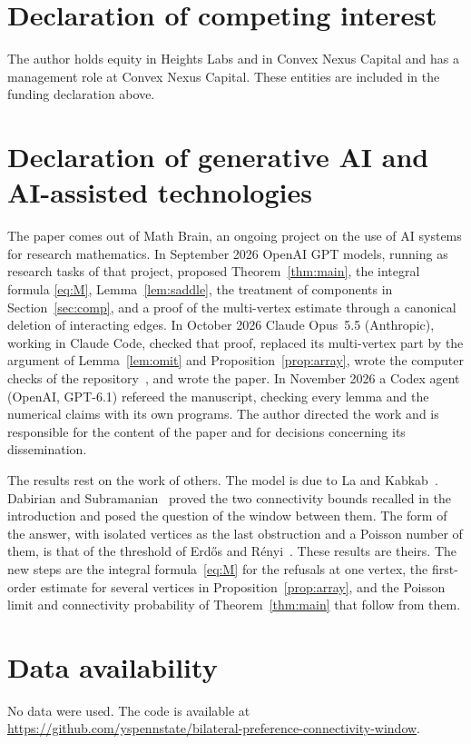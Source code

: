 \documentclass[11pt]{amsart}
\theoremstyle{remark}
\numberwithin{equation}{section}
\newcommand{\1}{\mathbf 1}
\begin{document}
\section*{Declaration of competing interest}
The author holds equity in Heights Labs and in Convex Nexus Capital and
has a management role at Convex Nexus Capital. These entities are included
in the funding declaration above.

\section*{Declaration of generative AI and AI-assisted technologies}
The paper comes out of Math Brain, an ongoing project on the use of AI systems for research mathematics. In September 2026 OpenAI GPT models, running as research tasks of that project, proposed Theorem~\ref{thm:main}, the integral formula \eqref{eq:M}, Lemma~\ref{lem:saddle}, the treatment of components in Section~\ref{sec:comp}, and a proof of the multi-vertex estimate through a canonical deletion of interacting edges. In October 2026 Claude Opus~5.5 (Anthropic), working in Claude Code, checked that proof, replaced its multi-vertex part by the argument of Lemma~\ref{lem:omit} and Proposition~\ref{prop:array}, wrote the computer checks of the repository~\cite{code}, and wrote the paper. In November 2026 a Codex agent (OpenAI, GPT-6.1) refereed the manuscript, checking every lemma and the numerical claims with its own programs. The author directed the work and is responsible for the content of the paper and for decisions concerning its dissemination.

The results rest on the work of others. The model is due to La and Kabkab~\cite{LK}. Dabirian and
Subramanian~\cite{DS} proved the two connectivity bounds recalled in the introduction and posed the question of the
window between them. The form of the answer, with isolated vertices as the last obstruction and a Poisson number of
them, is that of the threshold of Erd\H{o}s and R\'enyi~\cite{ER}. These results are theirs. The new steps are the
integral formula~\eqref{eq:M} for the refusals at one vertex, the first-order estimate for several vertices in
Proposition~\ref{prop:array}, and the Poisson limit and connectivity probability of Theorem~\ref{thm:main} that follow
from them.

\section*{Data availability}
No data were used. The code is available at\\ \url{https://github.com/yspennstate/bilateral-preference-connectivity-window}.
\end{document}
